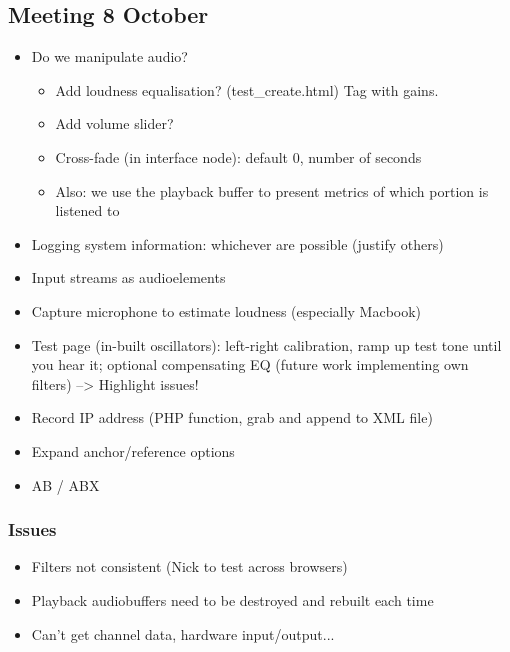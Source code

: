 \documentclass{sig-alternate}
\begin{document}
        \subsection{Meeting 8 October}
        \begin{itemize}
        	\item Do we manipulate audio?\\
	        	\begin{itemize}
	        		\item Add loudness equalisation? (test\_create.html) Tag with gains. 
	        		\item Add volume slider? 
	        		\item Cross-fade (in interface node): default 0, number of seconds
	        		\item Also: we use the playback buffer to present metrics of which portion is listened to
	        	\end{itemize}
	        \item Logging system information: whichever are possible (justify others)
	        \item Input streams as audioelements
	       	\item Capture microphone to estimate loudness (especially Macbook)
	       	\item Test page (in-built oscillators): left-right calibration, ramp up test tone until you hear it; optional compensating EQ (future work implementing own filters) --> Highlight issues! 
	       	\item Record IP address (PHP function, grab and append to XML file)
	       	\item Expand anchor/reference options
	       	\item AB / ABX
        \end{itemize}

        \subsubsection{Issues}
        \begin{itemize}
        	\item Filters not consistent (Nick to test across browsers)
        	\item Playback audiobuffers need to be destroyed and rebuilt each time
        	\item Can't get channel data, hardware input/output... 
        \end{itemize}

	
\end{document}
